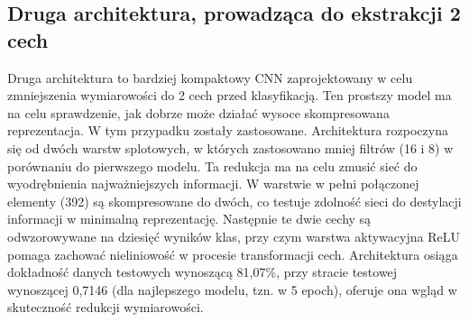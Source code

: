 \documentclass[10pt]{article}
\begin{document}
\subsection*{Druga architektura, prowadząca do ekstrakcji 2 cech}
Druga architektura to bardziej kompaktowy CNN zaprojektowany w celu zmniejszenia wymiarowości do 2 cech przed klasyfikacją. Ten prostszy model ma na celu sprawdzenie, jak dobrze może działać wysoce skompresowana reprezentacja. W tym przypadku zostały zastosowane.
Architektura rozpoczyna się od dwóch warstw splotowych, w których zastosowano mniej filtrów (16 i 8) w porównaniu do pierwszego modelu. Ta redukcja ma na celu zmusić sieć do wyodrębnienia najważniejszych informacji.
W warstwie w pełni połączonej elementy (392) są skompresowane do dwóch, co testuje zdolność sieci do destylacji informacji w minimalną reprezentację. Następnie te dwie cechy są odwzorowywane na dziesięć wyników klas, przy czym warstwa aktywacyjna ReLU pomaga zachować nieliniowość w procesie transformacji cech.
Architektura osiąga dokładność danych testowych wynoszącą 81,07\%, przy stracie testowej wynoszącej 0,7146 (dla najlepszego modelu, tzn. w 5 epoch), oferuje ona wgląd w skuteczność redukcji wymiarowości.
\end{document}
